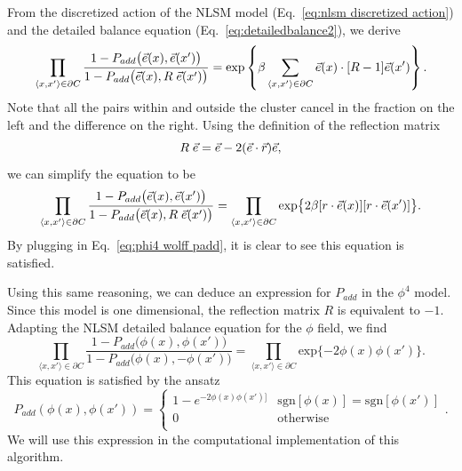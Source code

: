 From the discretized action of the NLSM model (Eq.~\ref{eq:nlsm discretized action}) and the detailed balance equation (Eq.~\ref{eq:detailedbalance2}), we derive
\begin{equation}
    \prod_{\langle x,x'\rangle \in \partial C}  \frac{ 1 - P_{add}\big(\vec e(x),\vec e(x')\big)}{ 1 - P_{add}\big(\vec e(x),R\;\vec e(x')\big)}  = \mathrm{exp}\left\{\beta\sum_{\langle x,x'\rangle \in \partial C} \vec e(x)\cdot[R-1]\vec e(x')\right\}.
\end{equation}
Note that all the pairs within and outside the cluster cancel in the fraction on the left and the difference on the right. Using the definition of the reflection matrix
\begin{equation}
    R\;\vec e = \vec e - 2(\vec e\cdot\vec{r})\vec e,
\end{equation}
we can simplify the equation to be 
\begin{equation}
    \prod_{\langle x,x'\rangle \in \partial C}  \frac{ 1 - P_{add}\big(\vec e(x),\vec e(x')\big)}{ 1 - P_{add}\big(\vec e(x),R\;\vec e(x')\big)}  = \prod_{\langle x,x'\rangle \in \partial C}\mathrm{exp}\big\{2\beta[r\cdot\vec e(x)][r\cdot\vec e(x')]\big\}.
\end{equation}
By plugging in Eq.~\ref{eq:phi4 wolff padd}, it is clear to see this equation is satisfied.

Using this same reasoning, we can deduce an expression for $P_{add}$ in the $\phi^4$ model. Since this model is one dimensional, the reflection matrix $R$ is equivalent to $-1$. Adapting the NLSM detailed balance equation for the $\phi$ field, we find
\begin{equation}
    \prod_{\langle x,x'\rangle \in \partial C}  \frac{ 1 - P_{add}\big(\phi(x),\phi(x')\big)}{ 1 - P_{add}\big(\phi(x),-\phi(x')\big)}  = \prod_{\langle x,x'\rangle \in \partial C}\mathrm{exp}\{-2 \phi(x)\phi(x')\}.
\end{equation}
This equation is satisfied by the ansatz
\begin{equation}
    \label{eq:nlsm wolff padd}
    P_{add}(\phi(x),\phi(x')) = \begin{cases} 
        1 - e^{-2\phi(x)\phi(x')]} & \mathrm{sgn}[\phi(x)]=\mathrm{sgn}[\phi(x')]\\
        0 & \mathrm{otherwise} \\
   \end{cases}.
\end{equation}
We will use this expression in the computational implementation of this algorithm.

